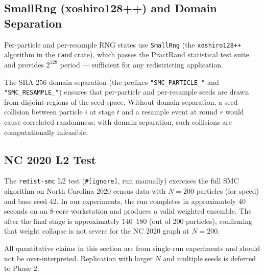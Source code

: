 \subsection{SmallRng (xoshiro128++) and Domain Separation}

Per-particle and per-resample RNG states use \texttt{SmallRng} (the
\texttt{xoshiro128++} algorithm in the \texttt{rand} crate), which passes the
PractRand statistical test suite and provides $2^{128}$ period --- sufficient
for any redistricting application.

The SHA-256 domain separation (the prefixes
\texttt{"SMC\_PARTICLE\_"} and \texttt{"SMC\_RESAMPLE\_"}) ensures that
per-particle and per-resample seeds are drawn from disjoint regions of the
seed space.
Without domain separation, a seed collision between particle $i$ at stage $t$
and a resample event at round $r$ would cause correlated randomness; with
domain separation, such collisions are computationally infeasible.

\subsection{NC 2020 L2 Test}

The \texttt{redist-smc} L2 test (\texttt{\#[ignore]}, run manually) exercises
the full SMC algorithm on North Carolina 2020 census data with $N = 200$
particles (for speed) and base seed 42.
In our experiments, the run completes in approximately 40 seconds on an 8-core
workstation and produces a valid weighted ensemble.
The \ess{} after the final stage is approximately $140$--$180$ (out of 200
particles), confirming that weight collapse is not severe for the NC 2020
graph at $N = 200$.

All quantitative claims in this section are from single-run experiments and
should not be over-interpreted.
Replication with larger $N$ and multiple seeds is deferred to Phase 2.
